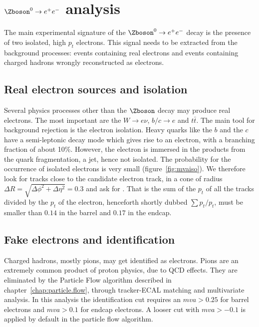 \chapter{$\Zboson^0 \rightarrow e^+e^-$ analysis}   \label{chap:analysis}
The main experimental signature of the $\Zboson^0\rightarrow e^+e^-$ decay is the presence of two isolated, high $p_t$ electrons. This signal needs to be extracted from the background processes: events containing real electrons and events containing charged hadrons wrongly reconstructed as electrons.
     \section{Real electron sources and isolation}
     Several physics processes other than the $\Zboson$ decay may produce real electrons. The most important are the $W\rightarrow e \nu$, $b/c \rightarrow e$ and $t\bar t$. The main tool for background rejection is the electron isolation. Heavy quarks like the $b$ and the $c$ have a semi-leptonic decay mode which gives rise to an electron, with a branching fraction of about 10\%. However, the electron is immersed in the products from the quark fragmentation,  a jet, hence not isolated. The probability for the occurrence of isolated electrons is very small (figure~\ref{fig:mvaiso}). We therefore look for tracks close to the candidate electron track, in a \qmo{}cone\qmc{} of radius $\Delta R = \sqrt{\Delta\phi^2 + \Delta\eta^2} = 0.3$ and ask for . That is the sum of the $p_t$ of all the tracks divided by the $p_t$ of the electron, henceforth shortly dubbed $\sum p_t / p_t$, must be smaller than $0.14$ in the barrel and $0.17$ in the endcap.
\section{Fake electrons and identification}
Charged hadrons, mostly pions, may get identified as electrons. Pions are an extremely common product of proton physics, due to QCD effects. They are eliminated by the Particle Flow algorithm described in chapter~\ref{chap:particle.flow}, through tracker-ECAL matching and multivariate analysis.
     In this analysis the identification cut requires an $mva > 0.25$ for barrel electrons and $mva > 0.1$ for endcap electrons. A looser cut with $mva > -0.1$ is applied by default in the particle flow algorithm.


